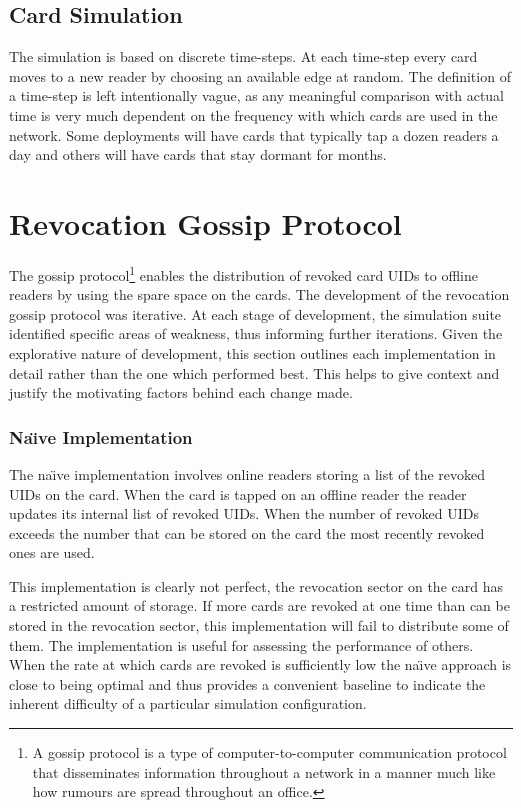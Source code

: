 \documentclass[dissertation.tex]{subfiles}
\begin{document}
  \subsection{Card Simulation}
  The simulation is based on discrete time-steps. At each time-step every card moves to a new reader by choosing an available edge at random. The definition of a time-step is left intentionally vague, as any meaningful comparison with actual time is very much dependent on the frequency with which cards are used in the network. Some deployments will have cards that typically tap a dozen readers a day and others will have cards that stay dormant for months.

  \section{Revocation Gossip Protocol}

  The gossip protocol\footnote{A gossip protocol is a type of computer-to-computer communication protocol that disseminates information throughout a network in a manner much like how rumours are spread throughout an office.} enables the distribution of revoked card UIDs to offline readers by using the spare space on the cards. The development of the revocation gossip protocol was iterative. At each stage of development, the simulation suite identified specific areas of weakness, thus informing further iterations. Given the explorative nature of development, this section outlines each implementation in detail rather than the one which performed best. This helps to give context and justify the motivating factors behind each change made.

  \subsubsection{Na\"{\i}ve Implementation}
  The na\"{\i}ve implementation involves online readers storing a list of the revoked UIDs on the card. When the card is tapped on an offline reader the reader updates its internal list of revoked UIDs. When the number of revoked UIDs exceeds the number that can be stored on the card the most recently revoked ones are used.

  This implementation is clearly not perfect, the revocation sector on the card has a restricted amount of storage. If more cards are revoked at one time than can be stored in the revocation sector, this implementation will fail to distribute some of them. The implementation is useful for assessing the performance of others. When the rate at which cards are revoked is sufficiently low the na\"{\i}ve approach is close to being optimal and thus provides a convenient baseline to indicate the inherent difficulty of a particular simulation configuration.
\end{document}
